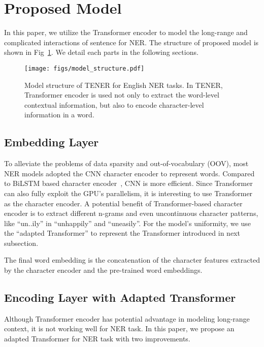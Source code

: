 \documentclass[11pt,a4paper]{article}
\begin{document}
\section{Proposed Model}

In this paper, we utilize the Transformer encoder to model the long-range and complicated interactions of sentence for NER.
The structure of proposed model is shown in Fig~\ref{fig:whole_model_structure}. We detail each parts in the following sections.

\begin{figure}[t]
    \centering
    \texttt{[image: figs/model\_structure.pdf]}
    \caption{Model structure of TENER for English NER tasks. In TENER, Transformer encoder is used not only to extract the word-level contextual information, but also to encode character-level information in a word.} \label{fig:whole_model_structure}
\end{figure}

\subsection{Embedding Layer}



To alleviate the problems of data sparsity and out-of-vocabulary (OOV), most NER models adopted the CNN character encoder \cite{ma2016end,ye2018hybrid,chen2019grn} to represent words.
Compared to BiLSTM based character encoder~\citep{lample2016neural,ghaddar2018robust}, CNN is more efficient. Since Transformer can also fully exploit the GPU's parallelism, it is interesting to use Transformer as the character encoder. A potential benefit of Transformer-based character encoder is to extract different n-grams and even uncontinuous character patterns, like ``un..ily'' in ``unhappily'' and ``uneasily''. For the model's uniformity, we use the ``adapted Transformer'' to represent the Transformer introduced in next subsection.

The final word embedding is the concatenation of the character features extracted by the character encoder and the pre-trained word embeddings.

\subsection{Encoding Layer with Adapted Transformer}



Although Transformer encoder has potential advantage in modeling long-range context, it is not working well for NER task. In this paper, we propose an adapted Transformer for NER task with two improvements.
\end{document}
